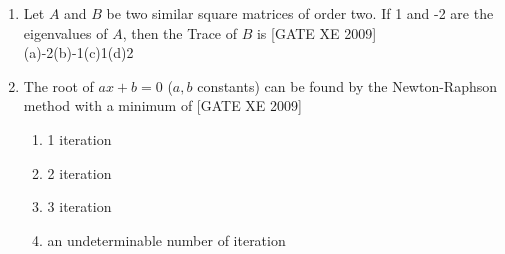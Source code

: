 \documentclass[journal,12pt,onecolumn]{IEEEtran}
\theoremstyle{remark}
\begin{document}
\begin{enumerate}

    \item[Q.1] Let $A$ and $B$ be two similar square matrices of order two. If 1 and -2 are the eigenvalues of $A$, then the Trace of $B$ is \hfill[GATE XE 2009]\\
(a)-2\hfill(b)-1\hfill(c)1\hfill(d)2
  

    \item[Q.2] The root of $ax + b = 0$ ($a,b$ constants) can be found by the Newton-Raphson method with a minimum of \hfill[GATE XE 2009]
    
 \begin{multicols}{2}
\begin{enumerate}
 
\item  1 iteration 
\item 2 iteration 
\item 3 iteration 
\item an undeterminable number of iteration
\end{enumerate}
 \end{multicols}
    
   
\end{enumerate}
\end{document}
